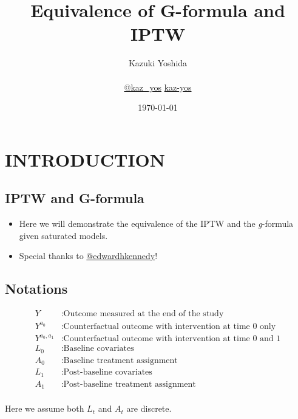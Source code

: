 \documentclass[dvipdfmx,10pt]{article}
\author{Kazuki Yoshida \\ \\ \faTwitter \href{https://twitter.com/kaz\_yos}{@kaz\_yos} \faGithub \href{https://github.com/kaz-yos/}{kaz-yos}}
\date{\today\\}
\title{Equivalence of G-formula and IPTW}
\begin{document}
\maketitle
\sloppy
\section{INTRODUCTION}
\label{sec:org8137a98}
\subsection{IPTW and G-formula}
\label{sec:org7b81037}
\begin{itemize}
\item Here we will demonstrate the equivalence of the IPTW \cite{robinsMarginalStructuralModels2000} and the \emph{g}-formula \cite{robinsNewApproachCausal1986} given saturated models.
\item Special thanks to \href{https://twitter.com/edwardhkennedy/status/1119305663564472320}{@edwardhkennedy}!
\end{itemize}

\subsection{Notations}
\label{sec:orge70ef42}
\begin{align*}
  Y &: \text{Outcome measured at the end of the study}\\
  Y^{a_{0}} &: \text{Counterfactual outcome with intervention at time 0 only}\\
  Y^{a_{0},a_{1}} &: \text{Counterfactual outcome with intervention at time 0 and 1}\\
  L_{0} &: \text{Baseline covariates}\\
  A_{0} &: \text{Baseline treatment assignment}\\
  L_{1} &: \text{Post-baseline covariates}\\
  A_{1} &: \text{Post-baseline treatment assignment}\\
\end{align*}

Here we assume both \(L_{t}\) and \(A_{t}\) are discrete.
\end{document}

